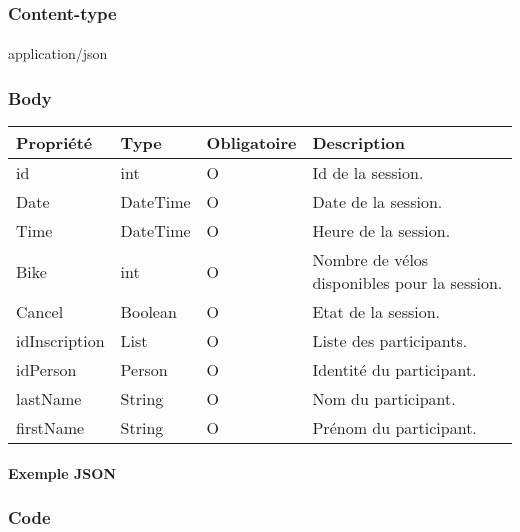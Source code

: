 	\subsubsection{Content-type}
		\paragraph{}
			application/json
	
	\subsubsection{Body}
		\begin{center}
			\begin{tabularx}{\textwidth}{| T{0.2122\textwidth} | S{0.22\textwidth} | S{0.15\textwidth} | S{0.3\textwidth} |}
				\hline
				Propriété & Type & Obligatoire & Description \\
				\hline
				id & int & O & Id de la session. \\
				\hline
				Date & DateTime & O & Date de la session. \\
				\hline
				Time & DateTime & O & Heure de la session. \\
				\hline
				Bike & int & O & Nombre de vélos disponibles pour la session. \\
				\hline
				Cancel & Boolean & O & Etat de la session. \\
				\hline
				idInscription & List & O & Liste des participants. \\
				\hline
				idPerson & Person & O & Identité du participant. \\
				\hline
				lastName & String & O & Nom du participant. \\
				\hline
				firstName & String & O & Prénom du participant. \\
				\hline
			\end{tabularx}
		\end{center}
		
	\newpage
		\paragraph{Exemple JSON}
			\paragraph{}
			
			
	\subsubsection{Code}
		\paragraph{}
